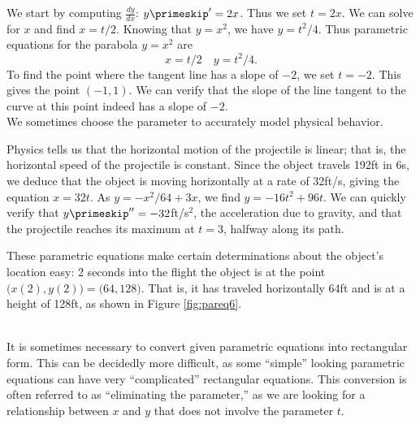 {We start by computing $\frac{dy}{dx}$: $y\primeskip' = 2x$. Thus we set $t=2x$. We can solve for $x$ and find $x= t/2$. Knowing that $y=x^2$, we have $y= t^2/4$. Thus parametric equations for the parabola $y=x^2$ are $$x=t/2 \quad y=t^2/4.$$
To find the point where the tangent line has a slope of $-2$, we set $t=-2$. This gives the point $(-1, 1)$. We can verify that the slope of the line tangent to the curve at this point indeed has a slope of $-2$.
}\\

We sometimes choose the parameter to accurately model physical behavior.\\

{Physics tells us that the horizontal motion of the projectile is linear; that is, the horizontal speed of the projectile is constant. Since the object travels 192ft in 6s, we deduce that the object is moving horizontally at a rate of 32ft/s, giving the equation $x=32t$. As $y=-x^2/64+3x$, we find $y= -16t^2+96t$. We can quickly verify that $y\primeskip''=-32$ft/s$^2$, the acceleration due to gravity, and that the projectile reaches its maximum at $t=3$, halfway along its path.

These parametric equations make certain determinations about the object's location easy: 2 seconds into the flight the object is at the point $\big(x(2),y(2)\big) = \big(64,128\big)$. That is, it has traveled horizontally 64ft and is at a height of 128ft, as shown in Figure \ref{fig:pareq6}.
}\\

It is  sometimes necessary to convert given parametric equations into rectangular form. This can be decidedly more difficult, as some ``simple'' looking parametric equations can have very ``complicated'' rectangular equations. This conversion is often referred to as ``eliminating the parameter,'' as we are looking for a relationship between $x$ and $y$ that does not involve the parameter $t$.\\

